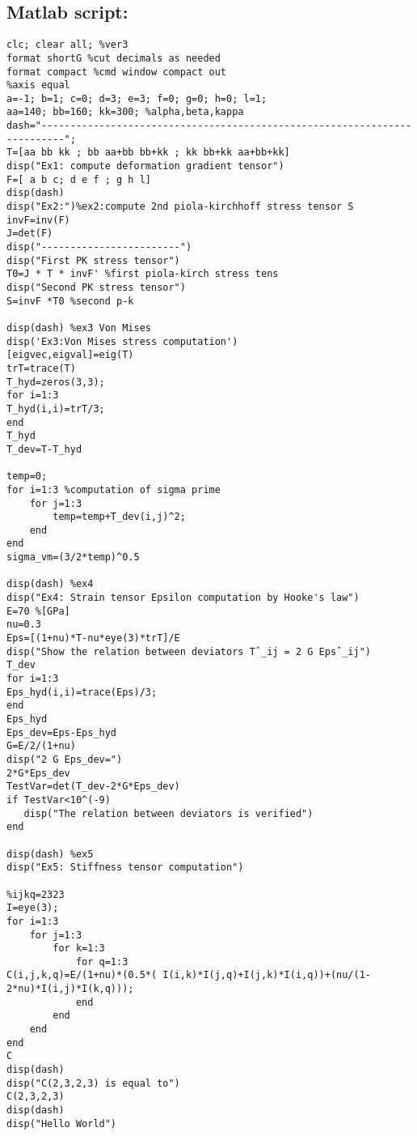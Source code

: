 \documentclass[a4paper,11pt]{article}
\begin{document}
\subsection{Matlab script:}
\begin{verbatim}
clc; clear all; %ver3
format shortG %cut decimals as needed
format compact %cmd window compact out
%axis equal
a=-1; b=1; c=0; d=3; e=3; f=0; g=0; h=0; l=1; 
aa=140; bb=160; kk=300; %alpha,beta,kappa
dash="--------------------------------------------------------------------------";
T=[aa bb kk ; bb aa+bb bb+kk ; kk bb+kk aa+bb+kk]
disp("Ex1: compute deformation gradient tensor")
F=[ a b c; d e f ; g h l]
disp(dash)
disp("Ex2:")%ex2:compute 2nd piola-kirchhoff stress tensor S
invF=inv(F)
J=det(F)
disp("------------------------")
disp("First PK stress tensor")
T0=J * T * invF' %first piola-kirch stress tens
disp("Second PK stress tensor")
S=invF *T0 %second p-k 

disp(dash) %ex3 Von Mises
disp('Ex3:Von Mises stress computation')
[eigvec,eigval]=eig(T)
trT=trace(T)
T_hyd=zeros(3,3);
for i=1:3
T_hyd(i,i)=trT/3;
end
T_hyd
T_dev=T-T_hyd

temp=0;
for i=1:3 %computation of sigma prime
    for j=1:3
        temp=temp+T_dev(i,j)^2;
    end
end
sigma_vm=(3/2*temp)^0.5

disp(dash) %ex4 
disp("Ex4: Strain tensor Epsilon computation by Hooke's law")
E=70 %[GPa]
nu=0.3
Eps=[(1+nu)*T-nu*eye(3)*trT]/E
disp("Show the relation between deviators Tˆ_ij = 2 G Epsˆ_ij")
T_dev
for i=1:3
Eps_hyd(i,i)=trace(Eps)/3;
end
Eps_hyd
Eps_dev=Eps-Eps_hyd
G=E/2/(1+nu)
disp("2 G Eps_dev=")
2*G*Eps_dev
TestVar=det(T_dev-2*G*Eps_dev)
if TestVar<10^(-9)
   disp("The relation between deviators is verified")
end

disp(dash) %ex5
disp("Ex5: Stiffness tensor computation")

%ijkq=2323
I=eye(3);
for i=1:3
    for j=1:3
        for k=1:3
            for q=1:3
C(i,j,k,q)=E/(1+nu)*(0.5*( I(i,k)*I(j,q)+I(j,k)*I(i,q))+(nu/(1-2*nu)*I(i,j)*I(k,q)));
            end
        end
    end
end
C
disp(dash)
disp("C(2,3,2,3) is equal to")
C(2,3,2,3)
disp(dash)
disp("Hello World")

\end{verbatim}
\end{document}
